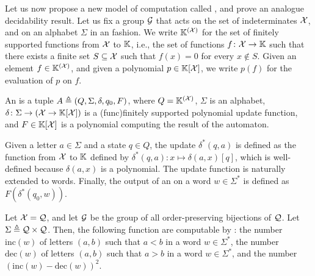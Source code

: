 \AP Let us now propose a new model of computation called , and prove an analogue decidability result. Let us fix a
group $\mathcal{G}$ that acts on the set of indeterminates $\mathcal{X}$, and on an
alphabet $\Sigma$ in an  fashion. We write
$\mathbb{K}^{(\mathcal{X})}$ for the set of finitely supported functions from $\mathcal{X}$ to
$\mathbb{K}$, i.e., the set of functions $f \colon \mathcal{X} \to \mathbb{K}$ such that there
exists a finite set $S \subseteq \mathcal{X}$ such that $f(x) = 0$ for every $x
\notin S$. Given an element $f \in \mathbb{K}^{(\mathcal{X})}$, and given a polynomial $p
\in \mathbb{K}[\mathcal{X}]$, we write $p(f)$ for the evaluation of $p$ on $f$.


\begin{definition}
  \label{def:orbit-finite-polynomial-automaton}
  An  is a tuple $A \triangleq (Q, \Sigma, \delta, q_0, F)$, where $Q =
  \mathbb{K}^{(\mathcal{X})}$, $\Sigma$ is an  alphabet, $\delta \colon
  \Sigma \to (\mathcal{X} \to \mathbb{K}[\mathcal{X}])$ is a \kl(func){finitely supported}
  polynomial update function, and $F \in \mathbb{K}[\mathcal{X}]$ is a polynomial
  computing the result of the automaton. 

  Given a letter $a \in \Sigma$ and a
  state $q \in Q$, the update $\delta^*(q,a)$ is defined as the function from
  $\mathcal{X}$ to $\mathbb{K}$ defined by $\delta^*(q,a) \colon x \mapsto \delta(a,x)[ q ]$,
  which is well-defined because $\delta(a,x)$ is a 
  polynomial. The update function is naturally extended to words. Finally, the
  output of an  on a word $w \in \Sigma^*$
  is defined as $F(\delta^*(q_0, w))$.
\end{definition}


\begin{example}
  \label{ex:orbit-finite-polynomial-automata}
  Let $\mathcal{X} = \mathcal{Q}$, and let $\mathcal{G}$ be the group of all
  order-preserving bijections of $\mathcal{Q}$.
  Let $\Sigma \triangleq \mathcal{Q} \times \mathcal{Q}$.
  Then, the following function are computable by 
  :
  the number $\mathrm{inc}(w)$ of letters $(a,b)$ such that $a < b$ in a word $w \in \Sigma^*$,
  the number $\mathrm{dec}(w)$ of letters $(a,b)$ such that $a > b$ in a word $w \in \Sigma^*$,
  and the number $(\mathrm{inc}(w) - \mathrm{dec}(w))^2$.
\end{example}

